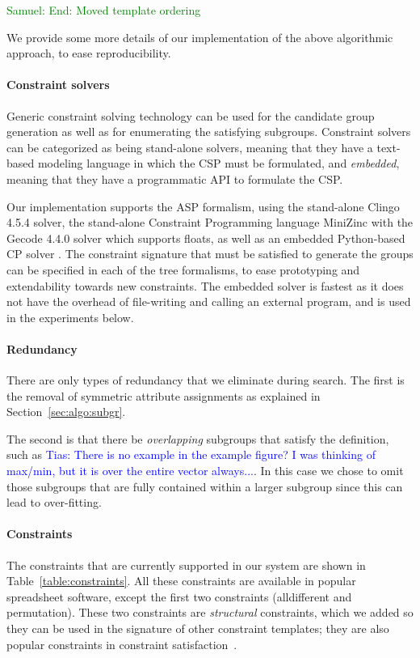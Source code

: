\documentclass{IEEEtran}
\newcommand{\samuel}[1]{\textcolor{green}{{\sc Samuel:} #1}\xspace}
\newcommand{\tias}[1]{\textcolor{blue}{{\sc Tias:} #1}\xspace}
\newcommand{\eccalc}[2]{\ensuremath{#1 = #2}}
\newcommand{\ecrank}[2]{\eccalc{#1}{\textit{RANK}(#2)}}
\theoremstyle{definition}
\begin{document}
\samuel{End: Moved template ordering}


We provide some more details of our implementation of the above algorithmic approach, to ease reproducibility.

\paragraph{Constraint solvers}
Generic constraint solving technology can be used for the candidate group generation as well as for enumerating the satisfying subgroups. Constraint solvers can be categorized as being stand-alone solvers, meaning that they have a text-based modeling language in which the CSP must be formulated, and \textit{embedded}, meaning that they have a programmatic API to formulate the CSP.

Our implementation supports the ASP \cite{whaisasp} formalism, using the stand-alone Clingo 4.5.4 \cite{clingo} solver, the stand-alone Constraint Programming language MiniZinc \cite{minizinc} with the Gecode 4.4.0 solver which supports floats, as well as an embedded Python-based CP solver \cite{python_constraint}. The constraint signature that must be satisfied to generate the groups can be specified in each of the tree formalisms, to ease prototyping and extendability towards new constraints. The embedded solver is fastest as it does not have the overhead of file-writing and calling an external program, and is used in the experiments below.

\paragraph{Redundancy}
There are only types of redundancy that we eliminate during search. The first is the removal of symmetric attribute assignments as explained in Section~\ref{sec:algo:subgr}.

The second is that there be \textit{overlapping} subgroups that satisfy the definition, such as \tias{There is no example in the example figure? I was thinking of max/min, but it is over the entire vector always...}.
In this case we chose to omit those subgroups that are fully contained within a larger subgroup since this can lead to over-fitting.

\paragraph{Constraints}
The constraints that are currently supported in our system are shown in Table~\ref{table:constraints}. All these constraints are available in popular spreadsheet software, except the first two constraints (alldifferent and permutation). These two constraints are \textit{structural} constraints, which we added so they can be used in the signature of other constraint templates; they are also popular constraints in constraint satisfaction~\cite{modelseeker}.
\end{document}
